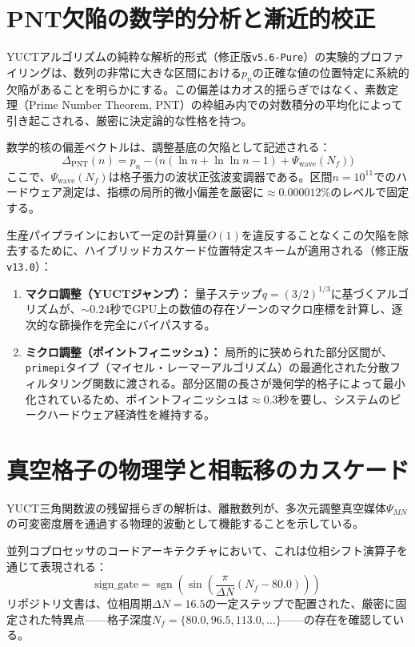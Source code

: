 \documentclass[11pt,a4paper]{article}
\begin{document}
	\section{PNT欠陥の数学的分析と漸近的校正}
	YUCTアルゴリズムの純粋な解析的形式（修正版\texttt{v5.6-Pure}）の実験的プロファイリングは、数列の非常に大きな区間における$p_n$の正確な値の位置特定に系統的欠陥があることを明らかにする。この偏差はカオス的揺らぎではなく、素数定理（Prime Number Theorem, PNT）の枠組み内での対数積分の平均化によって引き起こされる、厳密に決定論的な性格を持つ。
	
	数学的核の偏差ベクトルは、調整基底の欠陥として記述される：
	\begin{equation}
		\Delta_{\mathrm{PNT}}(n) = p_n - \bigl( n(\ln n + \ln\ln n - 1) + \Psi_{\mathrm{wave}}(N_f) \bigr)
	\end{equation}
	ここで、$\Psi_{\mathrm{wave}}(N_f)$は格子張力の波状正弦波変調器である。区間$n = 10^{11}$でのハードウェア測定は、指標の局所的微小偏差を厳密に$\approx 0.000012\%$のレベルで固定する。
	
	生産パイプラインにおいて一定の計算量$O(1)$を違反することなくこの欠陥を除去するために、ハイブリッドカスケード位置特定スキームが適用される（修正版\texttt{v13.0}）：
	\begin{enumerate}
		\item \textbf{マクロ調整（YUCTジャンプ）：} 量子ステップ$q = (3/2)^{1/3}$に基づくアルゴリズムが、$\sim 0.24$秒でGPU上の数値の存在ゾーンのマクロ座標を計算し、逐次的な篩操作を完全にバイパスする。
		\item \textbf{ミクロ調整（ポイントフィニッシュ）：} 局所的に狭められた部分区間が、\texttt{primepi}タイプ（マイセル・レーマーアルゴリズム）の最適化された分散フィルタリング関数に渡される。部分区間の長さが幾何学的格子によって最小化されているため、ポイントフィニッシュは$\approx 0.3$秒を要し、システムのピークハードウェア経済性を維持する。
	\end{enumerate}
	
	\section{真空格子の物理学と相転移のカスケード}
	YUCT三角関数波の残留揺らぎの解析は、離散数列が、多次元調整真空媒体$\Psi_{MN}$の可変密度層を通過する物理的波動として機能することを示している。
	
	並列コプロセッサのコードアーキテクチャにおいて、これは位相シフト演算子を通じて表現される：
	\begin{equation}
		\mathrm{sign\_gate} = \operatorname{sgn}\!\left(\sin\!\left(\frac{\pi}{\Delta N} (N_f - 80.0)\right)\right)
	\end{equation}
	リポジトリ文書は、位相周期$\Delta N = 16.5$の一定ステップで配置された、厳密に固定された特異点——格子深度$N_f = \{80.0, 96.5, 113.0, \dots\}$——の存在を確認している。
	
\end{document}

